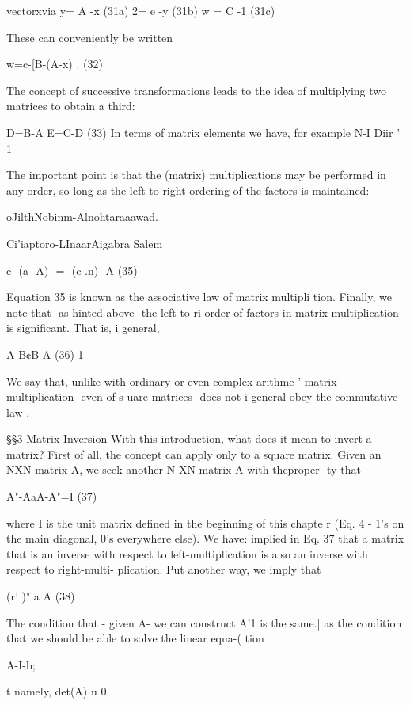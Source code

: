 {{{{{{{{vectorxvia
y= A -x (31a)
2= e -y (31b)
w = C -1 (31c)

These can conveniently be written

w=c-[B-(A-x) . (32)

 

The concept of successive transformations leads to the idea of
multiplying two matrices to obtain a third:

D=B-A E=C-D (33)
In terms of matrix elements we have, for example
N-I
Diir ' 1%

The important point is that the (matrix) multiplications may be
performed in any order, so long as the left-to-right ordering of
the factors is maintained:

oJilthNobinm-Alnohtaraaawad.

Ci'iaptoro-LInaarAigabra Salem

   
  
  
  
  

c- (a -A) -=- (c .n) -A (35)

Equation 35 is known as the associative law of matrix multipli
tion. Finally, we note that -as hinted above- the left-to-ri
order of factors in matrix multiplication is significant. That is, i
general,

A-B¢B-A (36) 1

We say that, unlike with ordinary or even complex arithme '
matrix multiplication -even of s uare matrices- does not i
general obey the commutative law .

\S\S3 Matrix Inversion
With this introduction, what does it mean to invert a matrix? First
of all, the concept can apply only to a square matrix. Given an
NXN matrix A, we seek another N XN matrix A with theproper-
ty that

 

A"-AaA-A"=I (37)

where I is the unit matrix defined in the beginning of this chapte r
(Eq. 4 - 1's on the main diagonal, 0's everywhere else). We have:
implied in Eq. 37 that a matrix that is an inverse with respect to
left-multiplication is also an inverse with respect to right-multi-
plication. Put another way, we imply that

(r' )" a A (38)

The condition that - given A- we can construct A'1 is the same.|
as the condition that we should be able to solve the linear equa-(
tion

A-I-b;

t namely, det(A) u 0.

}}}}}}}}
